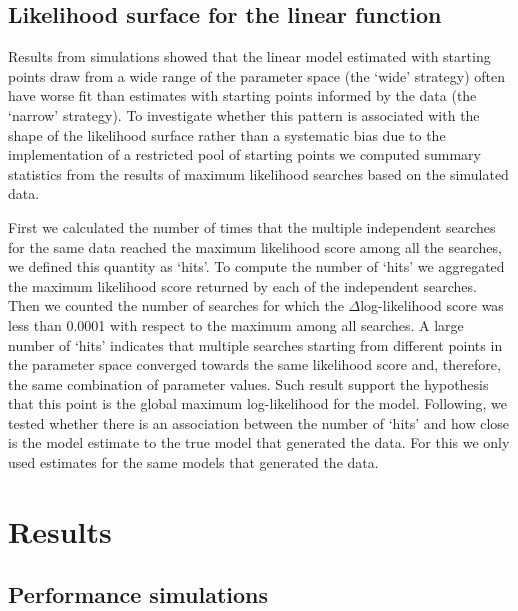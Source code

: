 \subsection{Likelihood surface for the linear function}

Results from simulations showed that the linear model estimated with starting points draw from a wide range of the parameter space (the `wide' strategy) often have worse fit than estimates with starting points informed by the data (the `narrow' strategy). To investigate whether this pattern is associated with the shape of the likelihood surface rather than a systematic bias due to the implementation of a restricted pool of starting points we computed summary statistics from the results of maximum likelihood searches based on the simulated data.

First we calculated the number of times that the multiple independent searches for the same data reached the maximum likelihood score among all the searches, we defined this quantity as `hits'. To compute the number of `hits' we aggregated the maximum likelihood score returned by each of the independent searches. Then we counted the number of searches for which the $\Delta$log-likelihood score was less than 0.0001 with respect to the maximum among all searches. A large number of `hits' indicates that multiple searches starting from different points in the parameter space converged towards the same likelihood score and, therefore, the same combination of parameter values. Such result support the hypothesis that this point is the global maximum log-likelihood for the model. Following, we tested whether there is an association between the number of `hits' and how close is the model estimate to the true model that generated the data. For this we only used estimates for the same models that generated the data.

\section{Results}

\subsection{Performance simulations}

